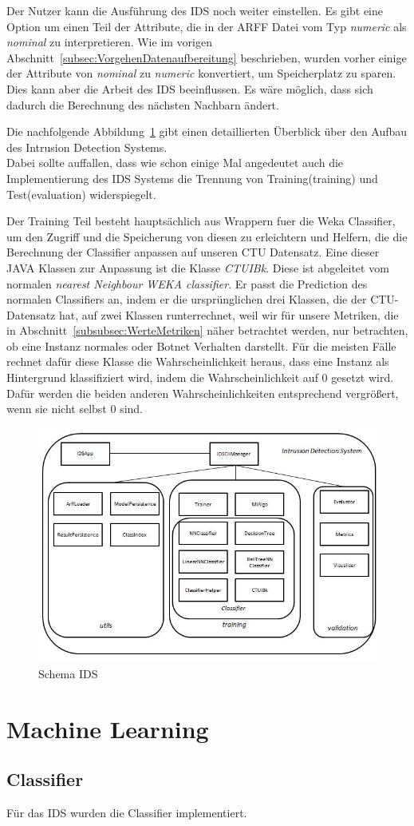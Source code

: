 \documentclass[main.tex]{subfiles}
\begin{document}
Der Nutzer kann die Ausführung des IDS noch weiter einstellen.
Es gibt eine Option um einen Teil der Attribute, die in der ARFF Datei vom Typ
\textit{numeric} als \textit{nominal} zu interpretieren.
Wie im vorigen Abschnitt~\ref{subsec:VorgehenDatenaufbereitung} beschrieben,
wurden vorher einige der Attribute von \textit{nominal} zu \textit{numeric}
konvertiert, um Speicherplatz zu sparen.
Dies kann aber die Arbeit des IDS beeinflussen.
Es wäre möglich, dass sich dadurch die Berechnung des nächsten Nachbarn ändert.

Die nachfolgende Abbildung~\ref{fig:schema_ids} gibt einen detaillierten Überblick über den Aufbau des Intrusion Detection Systems. \\
Dabei sollte auffallen, dass wie schon einige Mal angedeutet auch die
Implementierung des IDS Systems die Trennung von Training(training) und
Test(evaluation) widerspiegelt.

Der Training Teil besteht hauptsächlich aus Wrappern fuer die Weka Classifier,
um den Zugriff und die Speicherung von diesen zu erleichtern und Helfern, die
die Berechnung der Classifier anpassen auf unseren CTU Datensatz.
Eine dieser JAVA Klassen zur Anpassung ist die Klasse \textit{CTUIBk}.
Diese ist abgeleitet vom normalen \textit{nearest Neighbour WEKA classifier}.
Er passt die Prediction des normalen Classifiers an, indem er die ursprünglichen
drei Klassen, die der CTU-Datensatz hat, auf zwei Klassen runterrechnet, weil
wir für unsere Metriken, die in Abschnitt~\ref{subsubsec:WerteMetriken} näher
betrachtet werden, nur betrachten, ob eine Instanz normales oder Botnet
Verhalten darstellt.
Für die meisten Fälle rechnet dafür diese Klasse die Wahrscheinlichkeit heraus,
dass eine Instanz als Hintergrund klassifiziert wird, indem die
Wahrscheinlichkeit auf $0$ gesetzt wird.
Dafür werden die beiden anderen Wahrscheinlichkeiten entsprechend vergrößert, wenn
sie nicht selbst $0$ sind.

\begin{figure}[ht]
 \centering
 \includegraphics[width=1\textwidth]{images/Schema_IDS.jpg}
 \caption{Schema IDS}
 \label{fig:schema_ids}
\end{figure}

\section{Machine Learning}

\subsection{Classifier}
Für das IDS wurden die Classifier implementiert.
\end{document}
